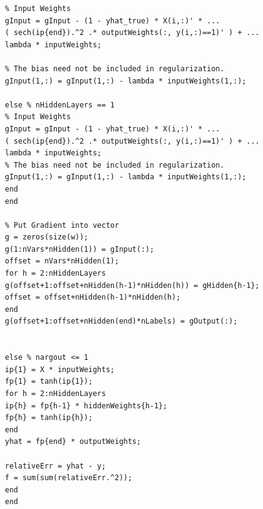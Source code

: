 \documentclass{article}
\begin{document}
\begin{lstlisting}
% Input Weights
gInput = gInput - (1 - yhat_true) * X(i,:)' * ...
( sech(ip{end}).^2 .* outputWeights(:, y(i,:)==1)' ) + ...
lambda * inputWeights;

% The bias need not be included in regularization.
gInput(1,:) = gInput(1,:) - lambda * inputWeights(1,:);

else % nHiddenLayers == 1
% Input Weights
gInput = gInput - (1 - yhat_true) * X(i,:)' * ...
( sech(ip{end}).^2 .* outputWeights(:, y(i,:)==1)' ) + ...
lambda * inputWeights;
% The bias need not be included in regularization.
gInput(1,:) = gInput(1,:) - lambda * inputWeights(1,:);
end
end

% Put Gradient into vector
g = zeros(size(w));
g(1:nVars*nHidden(1)) = gInput(:);
offset = nVars*nHidden(1);
for h = 2:nHiddenLayers
g(offset+1:offset+nHidden(h-1)*nHidden(h)) = gHidden{h-1};
offset = offset+nHidden(h-1)*nHidden(h);
end
g(offset+1:offset+nHidden(end)*nLabels) = gOutput(:);


else % nargout <= 1
ip{1} = X * inputWeights;
fp{1} = tanh(ip{1});
for h = 2:nHiddenLayers
ip{h} = fp{h-1} * hiddenWeights{h-1};
fp{h} = tanh(ip{h});
end
yhat = fp{end} * outputWeights;

relativeErr = yhat - y;
f = sum(sum(relativeErr.^2));
end
end
\end{lstlisting}
\end{document}
